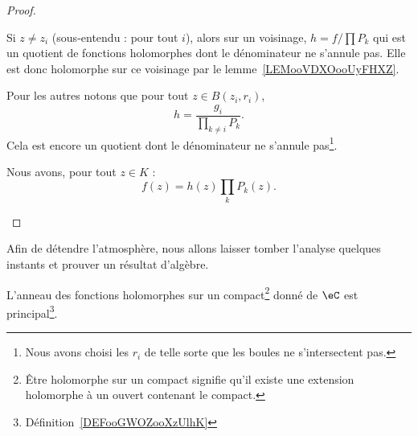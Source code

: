 \begin{proof}
\begin{subproof}
		Si \( z\neq z_i\) (sous-entendu : pour tout \( i\)), alors sur un voisinage, \( h=f/\prod P_k\) qui est un quotient de fonctions holomorphes dont le dénominateur ne s'annule pas. Elle est donc holomorphe sur ce voisinage par le lemme~\ref{LEMooVDXOooUyFHXZ}.

		Pour les autres notons que pour tout \( z\in B(z_i,r_i)\),
		\begin{equation}
			h=\frac{ g_i }{\prod_{k\neq i}P_k}.
		\end{equation}
		Cela est encore un quotient dont le dénominateur ne s'annule pas\footnote{Nous avons choisi les \( r_i\) de telle sorte que les boules ne s'intersectent pas.}.

		\spitem[La réponse]

		Nous avons, pour tout \( z\in K\) :
		\begin{equation}
			f(z)=h(z)\prod_{k}P_k(z).
		\end{equation}

	\end{subproof}
\end{proof}

Afin de détendre l'atmosphère, nous allons laisser tomber l'analyse quelques instants et prouver un résultat d'algèbre.
\begin{proposition}       \label{PROPooVWRPooGQMenV}
	L'anneau des fonctions holomorphes sur un compact\footnote{Être holomorphe sur un compact signifie qu'il existe une extension holomorphe à un ouvert contenant le compact.} donné de \( \eC\) est principal\footnote{Définition~\ref{DEFooGWOZooXzUlhK}}.
\end{proposition}

